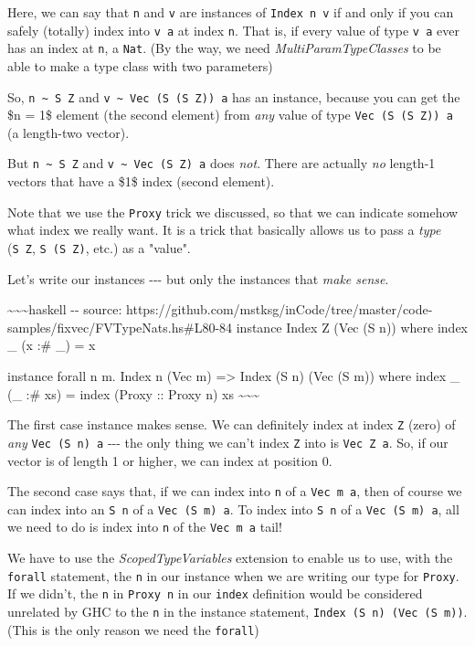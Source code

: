 \documentclass[]{article}
\begin{document}
Here, we can say that \texttt{n} and \texttt{v} are instances of
\texttt{Index\ n\ v} if and only if you can safely (totally) index into
\texttt{v\ a} at index \texttt{n}. That is, if every value of type \texttt{v\ a}
ever has an index at \texttt{n}, a \texttt{Nat}. (By the way, we need
\emph{MultiParamTypeClasses} to be able to make a type class with two
parameters)

So, \texttt{n\ \textasciitilde{}\ S\ Z} and
\texttt{v\ \textasciitilde{}\ Vec\ (S\ (S\ Z))\ a} has an instance, because you
can get the \$n = 1\$ element (the second element) from \emph{any} value of type
\texttt{Vec\ (S\ (S\ Z))\ a} (a length-two vector).

But \texttt{n\ \textasciitilde{}\ S\ Z} and
\texttt{v\ \textasciitilde{}\ Vec\ (S\ Z)\ a} does \emph{not}. There are
actually \emph{no} length-1 vectors that have a \$1\$ index (second element).

Note that we use the \texttt{Proxy} trick we discussed, so that we can indicate
somehow what index we really want. It is a trick that basically allows us to
pass a \emph{type} (\texttt{S\ Z}, \texttt{S\ (S\ Z)}, etc.) as a "value".

Let's write our instances -\/-\/- but only the instances that \emph{make sense}.

\textasciitilde{}\textasciitilde{}\textasciitilde{}haskell -\/- source:
https://github.com/mstksg/inCode/tree/master/code-samples/fixvec/FVTypeNats.hs\#L80-84
instance Index Z (Vec (S n)) where index \_ (x :\# \_) = x

instance forall n m. Index n (Vec m) =\textgreater{} Index (S n) (Vec (S m))
where index \_ (\_ :\# xs) = index (Proxy :: Proxy n) xs
\textasciitilde{}\textasciitilde{}\textasciitilde{}

The first case instance makes sense. We can definitely index at index \texttt{Z}
(zero) of \emph{any} \texttt{Vec\ (S\ n)\ a} -\/-\/- the only thing we can't
index \texttt{Z} into is \texttt{Vec\ Z\ a}. So, if our vector is of length 1 or
higher, we can index at position 0.

The second case says that, if we can index into \texttt{n} of a
\texttt{Vec\ m\ a}, then of course we can index into an \texttt{S\ n} of a
\texttt{Vec\ (S\ m)\ a}. To index into \texttt{S\ n} of a
\texttt{Vec\ (S\ m)\ a}, all we need to do is index into \texttt{n} of the
\texttt{Vec\ m\ a} tail!

We have to use the \emph{ScopedTypeVariables} extension to enable us to use,
with the \texttt{forall} statement, the \texttt{n} in our instance when we are
writing our type for \texttt{Proxy}. If we didn't, the \texttt{n} in
\texttt{Proxy\ n} in our \texttt{index} definition would be considered unrelated
by GHC to the \texttt{n} in the instance statement,
\texttt{Index\ (S\ n)\ (Vec\ (S\ m))}. (This is the only reason we need the
\texttt{forall})
\end{document}
